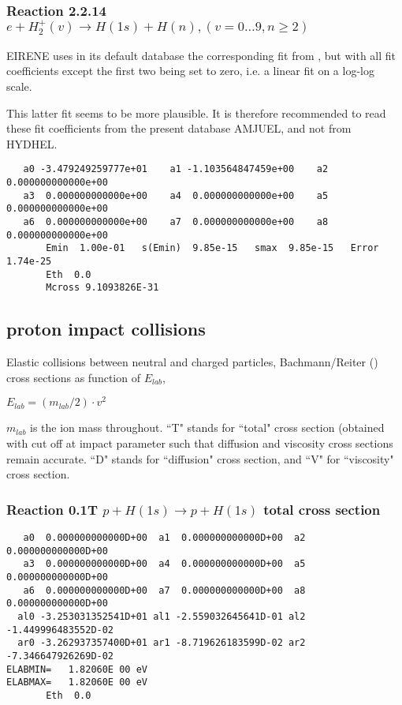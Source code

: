 \documentclass[12pt,dvipdfmx]{article}
\begin{document}
\subsubsection{
Reaction 2.2.14 $   e + H_2^+(v) \rightarrow H(1s) + H(n), (v=0\ldots 9, n\geq 2)$}


EIRENE uses in its default database the corresponding fit from \cite{kn:Janev},
but  with all fit coefficients except the first two being set to zero,
i.e. a linear fit on a log-log scale.

This latter fit seems to be more plausible.
It is therefore recommended to read these
fit coefficients from the present database AMJUEL, and not from HYDHEL.

\begin{small}\begin{verbatim}
   a0 -3.479249259777e+01    a1 -1.103564847459e+00    a2  0.000000000000e+00
   a3  0.000000000000e+00    a4  0.000000000000e+00    a5  0.000000000000e+00
   a6  0.000000000000e+00    a7  0.000000000000e+00    a8  0.000000000000e+00
       Emin  1.00e-01   s(Emin)  9.85e-15   smax  9.85e-15   Error  1.74e-25
       Eth  0.0
       Mcross 9.1093826E-31
\end{verbatim}\end{small}



\newpage

\subsection{proton impact collisions}\label{sect1.1}
\bigskip
Elastic collisions between neutral and charged particles,
Bachmann/Reiter (\cite{kn:Bachmann})
cross sections as function of $E_{lab}$,

$E_{lab} = (m_{lab}/2) \cdot v^2$

$m_{lab}$ is the ion mass throughout.  ``T" stands for ``total" cross section (obtained  with cut off
at impact parameter such that diffusion and viscosity cross sections remain accurate.
``D" stands for ``diffusion" cross section, and ``V" for ``viscosity" cross section.

\subsubsection{
Reaction 0.1T $p + H(1s) \rightarrow p + H(1s) $ total cross
section}

\begin{small}\begin{verbatim}
   a0  0.000000000000D+00  a1  0.000000000000D+00  a2  0.000000000000D+00
   a3  0.000000000000D+00  a4  0.000000000000D+00  a5  0.000000000000D+00
   a6  0.000000000000D+00  a7  0.000000000000D+00  a8  0.000000000000D+00
  al0 -3.253031352541D+01 al1 -2.559032645641D-01 al2 -1.449996483552D-02
  ar0 -3.262937357400D+01 ar1 -8.719626183599D-02 ar2 -7.346647926269D-02
ELABMIN=   1.82060E 00 eV
ELABMAX=   1.82060E 00 eV
       Eth  0.0
\end{verbatim}\end{small}
\end{document}
